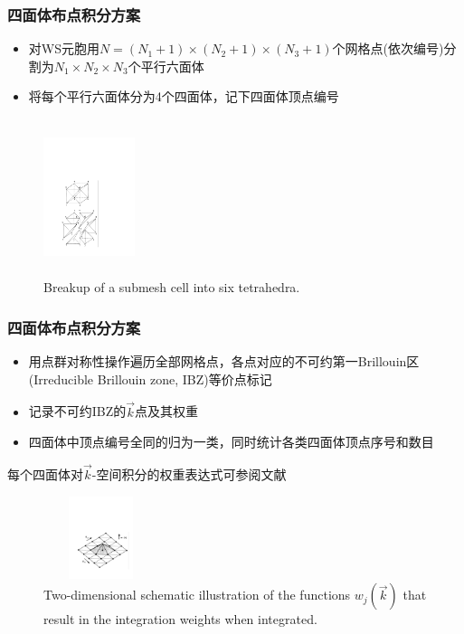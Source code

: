 \documentclass[cjk,slidestop,compress,mathserif,blue]{beamer}
\begin{document}
\frame
{
\frametitle{四面体布点积分方案}
\begin{itemize}
\setlength{\itemsep}{5pt}
	\item 对\textrm{WS}元胞用$N=(N_1+1)\times(N_2+1)\times(N_3+1)$个网格点(依次编号)分割为$N_1\times N_2\times N_3$个平行六面体
	\item 将每个平行六面体分为4个四面体，记下四面体顶点编号
\end{itemize}
\begin{figure}[h!]
\centering
\hspace*{-10pt}
\includegraphics[height=1.8in,width=1.05in,viewport=120 60 360 505,clip]{submesh_Tetra.pdf}
\caption{\small \textrm{Breakup of a submesh cell into six tetrahedra.}}%
\label{Tetrahedron_split}
\end{figure}

}
\frame
{
\frametitle{四面体布点积分方案}
\begin{itemize}
\setlength{\itemsep}{10pt}
	\item 用点群对称性操作遍历全部网格点，各点对应的不可约第一\textrm{Brillouin}区\textrm{(Irreducible Brillouin zone, IBZ)}等价点标记
	\item 记录不可约\textrm{IBZ}的$\vec k$点及其权重
	\item 四面体中顶点编号全同的归为一类，同时统计各类四面体顶点序号和数目
\end{itemize}
每个四面体对$\vec k$-空间积分的权重表达式可参阅文献\cite{PRB49-16233_1994}
\begin{figure}[h!]
\centering
\includegraphics[height=0.95in,width=1.32in,viewport=85 99 560 460,clip]{dimen_Tetra.pdf}
\caption{\small \textrm{Two-dimensional schematic illustration of the functions $w_j(\vec k)$ that result in the integration weights when integrated.}}%
\label{Tetrahedron_weight}
\end{figure}
}
\end{document}
